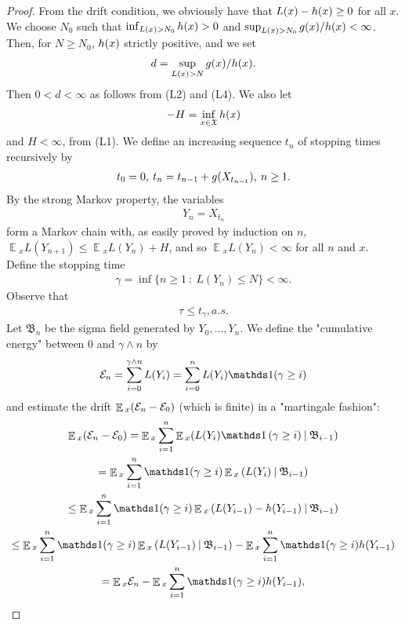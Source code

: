 \documentclass[10pt, reqno]{amsart}
\theoremstyle{definition}
\newcommand{\asaVar}{\mathfrak{B}} %
\newcommand{\astVar}{\tau} %
\newcommand{\ltfVar}{L} %
\newcommand{\assVar}{\mathfrak{X}} %
\DeclareMathOperator*{\E}{\mathbb{E}}
\begin{document}
	\begin{proof}
		From the drift condition, we obviously have that $\ltfVar(x) - \hffVar(x) \geq 0$ for all $x$. We choose $N_{0}$ such that $\inf_{\ltfVar(x) > N_{0}}\hffVar(x) > 0$ and $\sup_{\ltfVar(x) > N_{0}}\gffVar(x)/\hffVar(x) < \infty$. Then, for $N \geq N_{0}$, $h(x)$ strictly positive, and we set
		\begin{gather*}
			d = \sup_{\ltfVar(x) > N}\gffVar(x)/\hffVar(x).
		\end{gather*}
		Then $0 < d < \infty$ as follows from (L2) and (L4). We also let
		\begin{gather*}
			-H = \inf_{x \in \assVar}\hffVar(x)
		\end{gather*}
		and $H < \infty$, from (L1). We define an increasing sequence $t_{n}$ of stopping times recursively by
		\begin{gather*}
			t_{0} = 0, \: t_{n} = t_{n-1} + g(X_{t_{n-1}}), \: n \geq 1.
		\end{gather*}
		By the strong Markov property, the variables
		\begin{gather*}
			Y_{n} = X_{t_{n}}
		\end{gather*}
		form a Markov chain with, as easily proved by induction on $n$, $\E{}_{x}\ltfVar(Y_{n+1}) \leq \E{}_{x}\ltfVar(Y_{n}) + H$, and so $\E{}_{x}\ltfVar(Y_{n}) < \infty$ for all $n$ and $x$. Define the stopping time
		\begin{gather*}
			\gamma = \inf\{n \geq 1 \: : \: \ltfVar(Y_{n}) \leq N\} < \infty.
		\end{gather*}
		Observe that
		\begin{gather*}
			\astVar \leq t_{\gamma}, a.s.
		\end{gather*}
		Let $\asaVar_{n}$ be the sigma field generated by $Y_{0},..., Y_{n}$. We define the "cumulative energy"$ $ between 0 and $\gamma \wedge n$ by
		\begin{gather*}
			\cefVar_{n} = \sum_{i=0}^{\gamma \wedge n}\ltfVar(Y_{i}) = \sum_{i=0}^{n}\ltfVar(Y_{i})\indicator(\gamma \geq i)
		\end{gather*}
		and estimate the drift $\E{}_{x}(\cefVar_{n} - \cefVar_{0})$ (which is finite) in a "martingale fashion":
		\begin{gather*}
			\E{}_{x}(\cefVar_{n} - \cefVar_{0}) = \E{}_{x}\sum_{i=1}^{n}\E{}_{x}(\ltfVar(Y_{i})\indicator\left(\gamma \geq i) \: | \: \asaVar_{i-1}\right) \\= \E{}_{x}\sum_{i=1}^{n}\indicator(\gamma \geq i)\E{}_{x}\left(\ltfVar(Y_{i}) \: | \: \asaVar_{i-1}\right) \\ \leq \E{}_{x}\sum_{i=1}^{n}\indicator(\gamma \geq i)\E{}_{x}\left(\ltfVar(Y_{i-1}) - \hffVar(Y_{i-1}) \: | \: \asaVar_{i-1}\right) \\ \leq \E{}_{x}\sum_{i=1}^{n}\indicator(\gamma \geq i)\E{}_{x}\left(\ltfVar(Y_{i-1}) \: | \: \asaVar_{i-1}\right) -\E{}_{x}\sum_{i=1}^{n}\indicator(\gamma \geq i)\hffVar(Y_{i-1}) \\ = \E{}_{x}\cefVar_{n} - \E{}_{x}\sum_{i=1}^{n}\indicator(\gamma \geq i)\hffVar(Y_{i-1}),

\end{gather*}
\end{proof}
\end{document}
